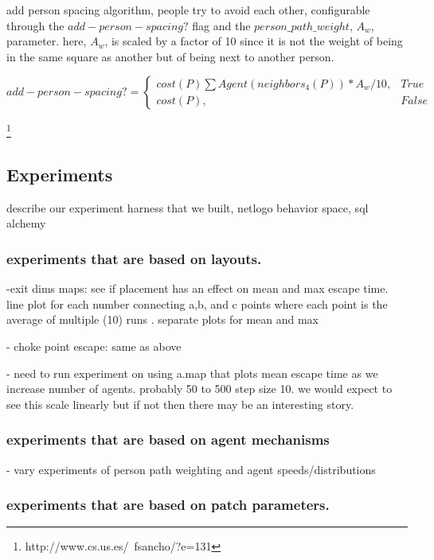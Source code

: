 \documentclass[12pt,letterpaper]{article}
\begin{document}
add person spacing algorithm, people try to avoid each other, configurable through the $add-person-spacing?$ flag and the $person\_path\_weight$, $A_w$, parameter.  here, $A_w$, is scaled by a factor of 10 since it is not the weight of being in the same square as another but of being next to another person.

\begin{equation}
add-person-spacing?=
\begin{cases}
	cost(P) \sum Agent(neighbors_4(P)) * A_w / 10, & True \\
	cost(P), & False
\end{cases}
\end{equation}

\cite{mirahmadiNovelAlgorithmRealtime2012}
\footnote{http://www.cs.us.es/~fsancho/?e=131}

\subsection{Experiments}

describe our experiment harness that we built, netlogo behavior space, sql alchemy

\subsubsection{experiments that are based on layouts.}  

-exit dims maps:  see if placement has an effect on mean and max escape time.  line plot for each number connecting a,b, and c points where each point is the average of multiple (10) runs . separate plots for mean and max

- choke point escape: same as above

- need to run experiment on using a.map that plots mean escape time as we increase number of agents.  probably 50 to 500 step size 10. we would expect to see this scale linearly but if not then there may be an interesting story.

\subsubsection{experiments that are based on agent mechanisms}

- vary experiments of person path weighting and agent speeds/distributions

\subsubsection{experiments that are based on patch parameters.}
\end{document}

